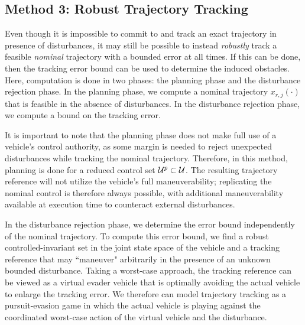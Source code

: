 \subsection{Method 3: Robust Trajectory Tracking \label{sec:rtt}}
Even though it is impossible to commit to and track an exact trajectory in presence of disturbances, it may still be possible to instead \textit{robustly} track a feasible \textit{nominal} trajectory with a bounded error at all times. If this can be done, then the tracking error bound can be used to determine the induced obstacles. Here, computation is done in two phases: the planning phase and the disturbance rejection phase. In the planning phase, we compute a nominal trajectory $x_{r,j}(\cdot)$ that is feasible in the absence of disturbances. In the disturbance rejection phase, we compute a bound on the tracking error.%

It is important to note that the planning phase does not make full use of a vehicle's control authority, as some margin is needed to reject unexpected disturbances while tracking the nominal trajectory. Therefore, in this method, planning is done for a reduced control set $\mathcal{U}^p\subset\mathcal{U}$. The resulting trajectory reference will not utilize the vehicle's full maneuverability; replicating the nominal control is therefore always possible, with additional maneuverability available at execution time to counteract external disturbances.

In the disturbance rejection phase, we determine the error bound independently of the nominal trajectory. To compute this error bound, we find a robust controlled-invariant set in the joint state space of the vehicle and a tracking reference that may ``maneuver" arbitrarily in the presence of an unknown bounded disturbance. Taking a worst-case approach, the tracking reference can be viewed as a virtual evader vehicle that is optimally avoiding the actual vehicle to enlarge the tracking error. We therefore can model trajectory tracking as a pursuit-evasion game in which the actual vehicle is playing against the coordinated worst-case action of the virtual vehicle and the disturbance. %

